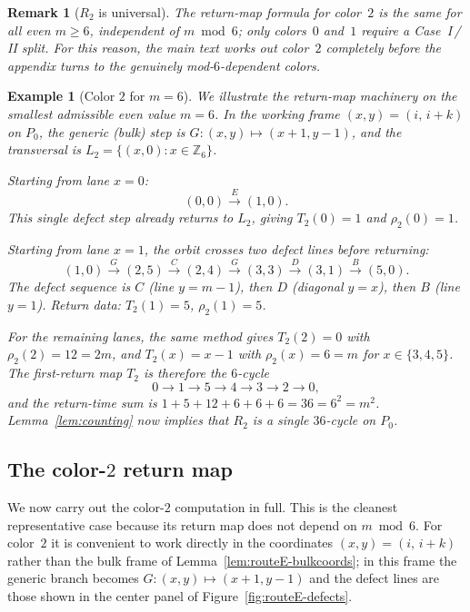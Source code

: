 \documentclass[11pt]{article}
\newtheorem{remark}{Remark}
\newtheorem{example}{Example}
\begin{document}
\begin{remark}[$R_2$ is universal]\label{rem:R2-universal}
The return-map formula for color~$2$ is the same for all even $m\ge 6$, independent of $m\bmod 6$; only colors~$0$ and~$1$ require a Case~I\,/\,II split.
For this reason, the main text works out color~$2$ completely before the appendix turns to the genuinely mod-$6$-dependent colors.
\end{remark}

\begin{example}[Color $2$ for $m=6$]\label{ex:m6-color2}
We illustrate the return-map machinery on the smallest admissible even value $m=6$.
In the working frame $(x,y)=(i,\,i+k)$ on $P_0$, the generic (bulk) step is $G\colon(x,y)\mapsto(x+1,y-1)$, and the transversal is $L_2=\{(x,0):x\in\mathbb Z_6\}$.

Starting from lane $x=0$:
\[
(0,0)\xrightarrow{E}(1,0).
\]
This single defect step already returns to $L_2$, giving $T_2(0)=1$ and $\rho_2(0)=1$.

Starting from lane $x=1$, the orbit crosses two defect lines before returning:
\[
(1,0)\xrightarrow{G}(2,5)\xrightarrow{C}(2,4)\xrightarrow{G}(3,3)
\xrightarrow{D}(3,1)\xrightarrow{B}(5,0).
\]
The defect sequence is $C$ (line $y=m{-}1$), then $D$ (diagonal $y=x$), then $B$ (line $y=1$).
Return data: $T_2(1)=5$, $\rho_2(1)=5$.

For the remaining lanes, the same method gives $T_2(2)=0$ with $\rho_2(2)=12=2m$, and $T_2(x)=x-1$ with $\rho_2(x)=6=m$ for $x\in\{3,4,5\}$.
The first-return map $T_2$ is therefore the $6$-cycle
\[
0\to 1\to 5\to 4\to 3\to 2\to 0,
\]
and the return-time sum is $1+5+12+6+6+6=36=6^2=m^2$.
Lemma~\ref{lem:counting} now implies that $R_2$ is a single $36$-cycle on $P_0$.
\end{example}

\subsection{The color-$2$ return map}\label{sec:even-r2}
We now carry out the color-$2$ computation in full.
This is the cleanest representative case because its return map does not depend on $m\bmod 6$.
For color~$2$ it is convenient to work directly in the coordinates $(x,y)=(i,\,i+k)$ rather than the bulk frame of Lemma~\ref{lem:routeE-bulkcoords}; in this frame the generic branch becomes $G\colon(x,y)\mapsto(x+1,y-1)$ and the defect lines are those shown in the center panel of Figure~\ref{fig:routeE-defects}.
\end{document}
